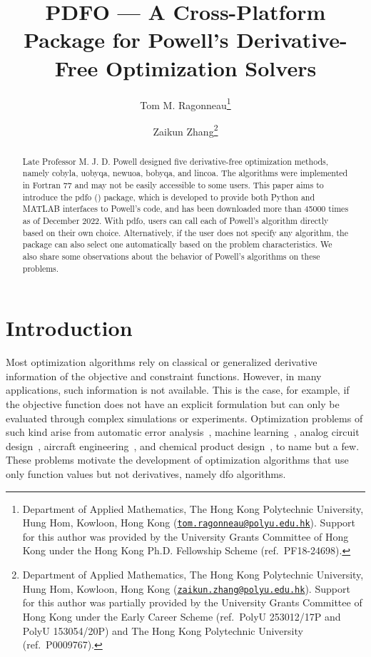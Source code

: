 \documentclass[11pt,draft]{article}
\title{PDFO --- A Cross-Platform Package for Powell's Derivative-Free Optimization Solvers}
\author{
    Tom M. Ragonneau\thanks{
        Department of Applied Mathematics, The Hong Kong Polytechnic University, Hung Hom, Kowloon, Hong Kong (\href{mailto:tom.ragonneau@polyu.edu.hk}{\texttt{tom.ragonneau@polyu.edu.hk}}).
        Support for this author was provided by the University Grants Committee of Hong Kong under the Hong Kong Ph.D. Fellowship Scheme (ref.\ PF18-24698).
    }
    \and Zaikun Zhang\thanks{
        Department of Applied Mathematics, The Hong Kong Polytechnic University, Hung Hom, Kowloon, Hong Kong (\href{mailto:zaikun.zhang@polyu.edu.hk}{\texttt{zaikun.zhang@polyu.edu.hk}}).
        Support for this author was partially provided by the University Grants Committee of Hong Kong under the Early Career Scheme (ref.\ PolyU 253012/17P and PolyU 153054/20P) and The Hong Kong Polytechnic University (ref.\ P0009767).
    }
}
\numberwithin{equation}{section}
\begin{document}
\maketitle

\begin{abstract}
    Late Professor M. J. D. Powell designed five derivative-free optimization methods, namely \gls{cobyla}, \gls{uobyqa}, \gls{newuoa}, \gls{bobyqa}, and \gls{lincoa}.
    The algorithms were implemented in Fortran 77 and may not be easily accessible to some users.
    This paper aims to introduce the \gls{pdfo} () package, which is developed to provide both Python and MATLAB interfaces to Powell's code, and has been downloaded more than \num{45000} times as of December 2022.
    With \gls{pdfo}, users can call each of Powell's algorithm directly based on their own choice.
    Alternatively, if the user does not specify any algorithm, the package can also select one automatically based on the problem characteristics.
    We also share some observations about the behavior of Powell's algorithms on these problems.
\end{abstract}

\section{Introduction}

Most optimization algorithms rely on classical or generalized derivative information of the objective and constraint functions.
However, in many applications, such information is not available.
This is the case, for example, if the objective function does not have an explicit formulation but can only be evaluated through complex simulations or experiments.
Optimization problems of such kind arise from automatic error analysis~\cite{Higham_1993,Higham_2002}, machine learning~\cite{Ghanbari_Scheinberg_2017}, analog circuit design~\cite{Latorre_Etal_2019}, aircraft engineering~\cite{Gazaix_Etal_2019}, and chemical product design~\cite{Sun_Etal_2020}, to name but a few.
These problems motivate the development of optimization algorithms that use only function values but not derivatives, namely \gls{dfo} algorithms.
\end{document}
